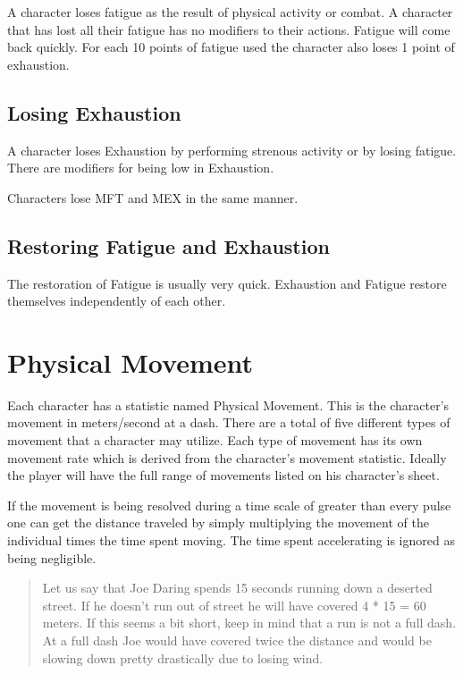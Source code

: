 A character loses fatigue as the result of physical activity or combat. 
A character that has lost all their fatigue has no modifiers to their actions.
Fatigue will come back quickly. For each 10 points of fatigue used the character 
also loses 1 point of exhaustion.

\subsection{Losing Exhaustion}
A character loses Exhaustion by performing strenous activity or by losing 
fatigue. There are modifiers for being low in Exhaustion.



Characters lose MFT and MEX in the same manner.



\subsection{Restoring Fatigue and Exhaustion}

The restoration of Fatigue is usually very quick. Exhaustion and Fatigue
restore themselves independently of each other.



\section{Physical Movement}

Each character has a statistic named Physical Movement. This is the character's
movement in meters/second at a dash. There are a total of five different types
of movement that a character may utilize. Each type of movement has its own
movement rate which is derived from the character's movement statistic. 
Ideally the player will have the full range of movements listed on his 
character's sheet. 



If the movement is being resolved during a time scale of greater than every
pulse one can get the distance traveled by simply multiplying the movement 
of the individual times the time spent moving. The time spent accelerating
is ignored as being negligible.

\begin{quote}
Let us say that Joe Daring spends 15 seconds running down a deserted street.
If he doesn't run out of street he will have covered 4 * 15 = 60 meters. If 
this seems a bit short, keep in mind that a run is not a full dash. At a full
dash Joe would have covered twice the distance and would be slowing down pretty 
drastically due to losing wind.
\end{quote}

